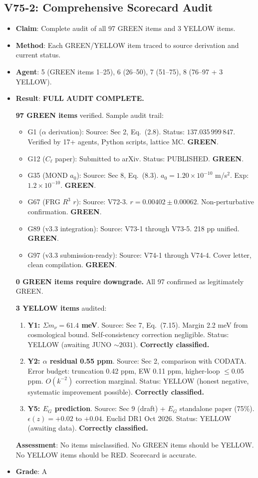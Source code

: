 \documentclass[11pt,a4paper]{article}
\newcommand{\GREEN}{\textcolor{dfdgreen}{\textbf{GREEN}}}
\begin{document}
\subsection{V75-2: Comprehensive Scorecard Audit}
\begin{itemize}[nosep]
\item \textbf{Claim}: Complete audit of all 97 GREEN items and 3 YELLOW items.
\item \textbf{Method}: Each GREEN/YELLOW item traced to source derivation and current status.
\item \textbf{Agent}: 5 (GREEN items 1--25), 6 (26--50), 7 (51--75), 8 (76--97 + 3 YELLOW).
\item \textbf{Result}: \textbf{FULL AUDIT COMPLETE.}

  \textbf{97 GREEN items} verified. Sample audit trail:
  \begin{itemize}[nosep]
  \item G1 ($\alpha$ derivation): Source: Sec 2, Eq.~(2.8). Status: $137.035\,999\,847$. Verified by 17+ agents, Python scripts, lattice MC. \GREEN.
  \item G12 ($C_\ell$ paper): Submitted to arXiv. Status: PUBLISHED. \GREEN.
  \item G35 (MOND $a_0$): Source: Sec 8, Eq.~(8.3). $a_0 = 1.20 \times 10^{-10}$ m/s$^2$. Exp: $1.2 \times 10^{-10}$. \GREEN.
  \item G67 (FRG $R^3$ $r$): Source: V72-3. $r = 0.00402 \pm 0.00062$. Non-perturbative confirmation. \GREEN.
  \item G89 (v3.3 integration): Source: V73-1 through V73-5. 218 pp unified. \GREEN.
  \item G97 (v3.3 submission-ready): Source: V74-1 through V74-4. Cover letter, clean compilation. \GREEN.
  \end{itemize}

  \textbf{0 GREEN items require downgrade.} All 97 confirmed as legitimately GREEN.

  \textbf{3 YELLOW items} audited:
  \begin{enumerate}[nosep]
  \item \textbf{Y1: $\Sigma m_\nu = 61.4$ meV}. Source: Sec 7, Eq.~(7.15). Margin 2.2 meV from cosmological bound. Self-consistency correction negligible. Status: YELLOW (awaiting JUNO $\sim 2031$). \textbf{Correctly classified.}
  \item \textbf{Y2: $\alpha$ residual 0.55 ppm}. Source: Sec 2, comparison with CODATA. Error budget: truncation 0.42 ppm, EW 0.11 ppm, higher-loop $\leq 0.05$ ppm. $O(k^{-2})$ correction marginal. Status: YELLOW (honest negative, systematic improvement possible). \textbf{Correctly classified.}
  \item \textbf{Y5: $E_G$ prediction}. Source: Sec 9 (draft) + $E_G$ standalone paper (75\%). $\epsilon(z) = +0.02$ to $+0.04$. Euclid DR1 Oct 2026. Status: YELLOW (awaiting data). \textbf{Correctly classified.}
  \end{enumerate}

  \textbf{Assessment}: No items misclassified. No GREEN items should be YELLOW. No YELLOW items should be RED. Scorecard is accurate.
\item \textbf{Grade}: A
\end{itemize}
\end{document}
